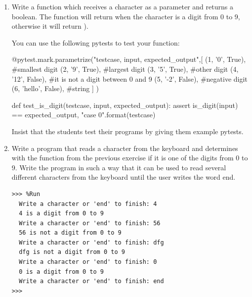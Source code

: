 \documentclass[
  fontsize=10pt,
  a4paper,
]{scrartcl}
\newenvironment{howTILEd}%
  {\begin{mdframed}[skipabove=10pt,skipbelow=10pt,backgroundcolor=pink!40]}%
  {\end{mdframed}}
\begin{document}
\begin{enumerate}

%
%

\item Write a function  which receives a character as a parameter and returns a boolean. The function will return  when the character is a digit from 0 to 9, otherwise it will return ). 

You can use the following pytests to test your function:

\begin{python}
@pytest.mark.parametrize("testcase, input, expected_output",[
    (1, '0', True),          #smallest digit
    (2, '9', True),          #largest digit
    (3, '5', True),          #other digit
    (4, '12', False),        #it is not a digit between 0 and 9
    (5, '-2', False),        #negative digit
    (6, 'hello', False),     #string
    ]
)

def test_is_digit(testcase, input, expected_output):
    assert is_digit(input) == expected_output, "case {0}".format(testcase)
\end{python}


\begin{howTILEd}
Insist that the students test their programs by giving them example pytests.
\end{howTILEd}




\item Write a program that reads a character from the keyboard and determines with the function  from the previous exercise if it is one of the digits from 0 to 9. Write the program in such a way that it can be used to read several different characters from the keyboard until the user writes the word end.

\begin{Verbatim}[frame=single, label={\em examples of test executions}]
>>> %Run 
  Write a character or 'end' to finish: 4
  4 is a digit from 0 to 9
  Write a character or 'end' to finish: 56
  56 is not a digit from 0 to 9
  Write a character or 'end' to finish: dfg
  dfg is not a digit from 0 to 9
  Write a character or 'end' to finish: 0
  0 is a digit from 0 to 9
  Write a character or 'end' to finish: end
>>>    
\end{Verbatim}



\end{enumerate}
\end{document}

